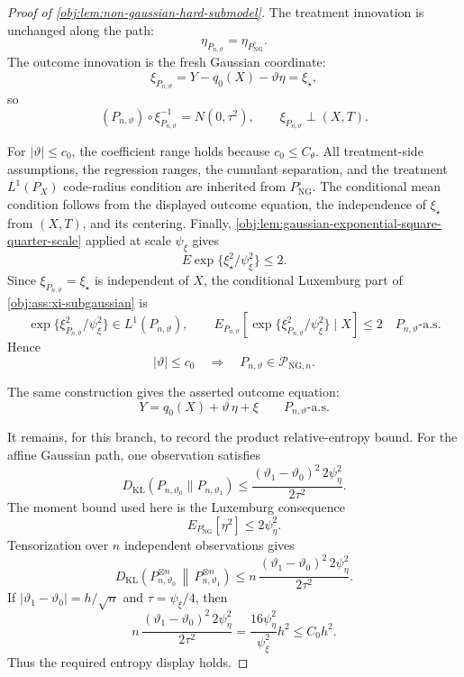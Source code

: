 \begin{proof}[Proof of \cref{obj:lem:non-gaussian-hard-submodel}]
The treatment innovation is unchanged along the path:
\[
\eta_{P_{n,\vartheta}}=\eta_{P_{\mathrm{NG}}^\circ}.
\]
The outcome innovation is the fresh Gaussian coordinate:
\[
\xi_{P_{n,\vartheta}}
=
Y-q_0(X)-\vartheta\eta
=
\xi_\star,
\]
so
\[
(P_{n,\vartheta})\circ \xi_{P_{n,\vartheta}}^{-1}
=
N(0,\tau^2),
\qquad
\xi_{P_{n,\vartheta}}\perp (X,T).
\]

For \(|\vartheta|\le c_0\), the coefficient range holds because \(c_0\le C_{\theta}\).  All treatment-side assumptions, the regression ranges, the cumulant separation, and the treatment \(L^1(P_X)\) code-radius condition are inherited from \(P_{\mathrm{NG}}^\circ\).  The conditional mean condition follows from the displayed outcome equation, the independence of \(\xi_\star\) from \((X,T)\), and its centering.  Finally, \cref{obj:lem:gaussian-exponential-square-quarter-scale} applied at scale \(\psi_\xi\) gives
\[
E\exp\{\xi_\star^2/\psi_\xi^2\}\le2.
\]
Since \(\xi_{P_{n,\vartheta}}=\xi_\star\) is independent of \(X\), the conditional Luxemburg part of \cref{obj:ass:xi-subgaussian} is
\[
\exp\{\xi_{P_{n,\vartheta}}^2/\psi_\xi^2\}\in L^1(P_{n,\vartheta}),
\qquad
E_{P_{n,\vartheta}}\!\left[
\exp\{\xi_{P_{n,\vartheta}}^2/\psi_\xi^2\}\mid X
\right]
\le 2
\quad P_{n,\vartheta}\text{-a.s.}
\]
Hence
\[
|\vartheta|\le c_0
\quad\Longrightarrow\quad
P_{n,\vartheta}\in\mathcal P_{\mathrm{NG},n}.
\]

The same construction gives the asserted outcome equation:
\[
Y=q_0(X)+\vartheta\,\eta+\xi
\qquad P_{n,\vartheta}\text{-a.s.}
\]

It remains, for this branch, to record the product relative-entropy bound.  For the affine Gaussian path, one observation satisfies
\[
D_{\mathrm{KL}}(P_{n,\vartheta_0}\|P_{n,\vartheta_1})
\le
\frac{(\vartheta_1-\vartheta_0)^2\,2\psi_{\eta}^2}{2\tau^2}.
\]
The moment bound used here is the Luxemburg consequence
\[
E_{P_{\mathrm{NG}}^\circ}[\eta^2]\le 2\psi_{\eta}^2 .
\]
Tensorization over \(n\) independent observations gives
\[
D_{\mathrm{KL}}\!\left(P_{n,\vartheta_0}^{\otimes n}\,\middle\|\,P_{n,\vartheta_1}^{\otimes n}\right)
\le
n\,\frac{(\vartheta_1-\vartheta_0)^2\,2\psi_{\eta}^2}{2\tau^2}.
\]
If \(|\vartheta_1-\vartheta_0|=h/\sqrt n\) and \(\tau=\psi_\xi/4\), then
\[
n\,\frac{(\vartheta_1-\vartheta_0)^2\,2\psi_{\eta}^2}{2\tau^2}
=
\frac{16\psi_{\eta}^2}{\psi_\xi^2}h^2
\le C_0h^2 .
\]
Thus the required entropy display holds. %


\end{proof}
